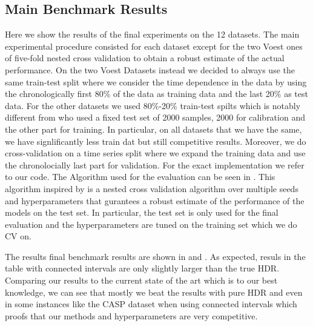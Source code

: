 \subsection{Main Benchmark Results}
Here we show the results of the final experiments on the 12 datasets. The main experimental procedure consisted for each dataset except for the two Voest ones of five-fold nested cross validation to obtain a robust estimate of the actual performance. On the two Voest Datasets instead we decided to always use the same train-test split where we consider the time dependence in the data by using the chronologically first 80\% of the data as training data and the last 20\% as test data. For the other datasets we used 80\%-20\% train-test spilts which is notably different from \cite{sesia2021conformal} who used a fixed test set of 2000 samples, 2000 for calibration and the other part for training. In particular, on all datasets that we have the same, we have signlificantly less train dat but still competitive results.  Moreover, we do cross-validation on a time series split where we expand the training data and use the chronolocially last part for validation. For the exact implementation we refer to our code. The Algorithm used for the evaluation can be seen in . This algorithm inspired by \cite{rothfuss2019noise} is a nested cross validation algorithm over multiple seeds and hyperparameters that gurantees a robust estimate of the performance of the models on the test set. In particular, the test set is only used for the final evaluation and the hyperparameters are tuned on the training set which we do CV on.

The results final benchmark results are shown in  and . As expected, resuls in the table with connected intervals are only slightly larger than the true HDR. Comparing our results to the current state of the art which is \cite{sesia2021conformal} to our best knowledge, we can see that mostly we beat the results with pure HDR and even in some instances like the CASP dataset when using connected intervals which proofs that our methods and hyperparameters are very competitive.

